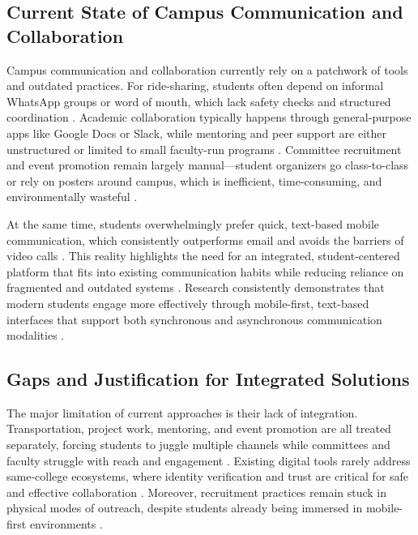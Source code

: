 \documentclass[conference]{IEEEtran}
\begin{document}
\subsection{Current State of Campus Communication and Collaboration}

Campus communication and collaboration currently rely on a patchwork of tools and outdated practices. For ride-sharing, students often depend on informal WhatsApp groups or word of mouth, which lack safety checks and structured coordination \cite{ref15}\cite{ref16}. Academic collaboration typically happens through general-purpose apps like Google Docs or Slack, while mentoring and peer support are either unstructured or limited to small faculty-run programs \cite{ref17}\cite{ref1}. Committee recruitment and event promotion remain largely manual—student organizers go class-to-class or rely on posters around campus, which is inefficient, time-consuming, and environmentally wasteful \cite{ref2}\cite{ref3}.

At the same time, students overwhelmingly prefer quick, text-based mobile communication, which consistently outperforms email and avoids the barriers of video calls \cite{ref4}\cite{ref5}. This reality highlights the need for an integrated, student-centered platform that fits into existing communication habits while reducing reliance on fragmented and outdated systems \cite{ref6}\cite{ref7}. Research consistently demonstrates that modern students engage more effectively through mobile-first, text-based interfaces that support both synchronous and asynchronous communication modalities \cite{ref8}\cite{ref9}.

\subsection{Gaps and Justification for Integrated Solutions}

The major limitation of current approaches is their lack of integration. Transportation, project work, mentoring, and event promotion are all treated separately, forcing students to juggle multiple channels while committees and faculty struggle with reach and engagement \cite{ref10}\cite{ref11}. Existing digital tools rarely address same-college ecosystems, where identity verification and trust are critical for safe and effective collaboration \cite{ref12}\cite{ref13}. Moreover, recruitment practices remain stuck in physical modes of outreach, despite students already being immersed in mobile-first environments \cite{ref14}.
\end{document}
